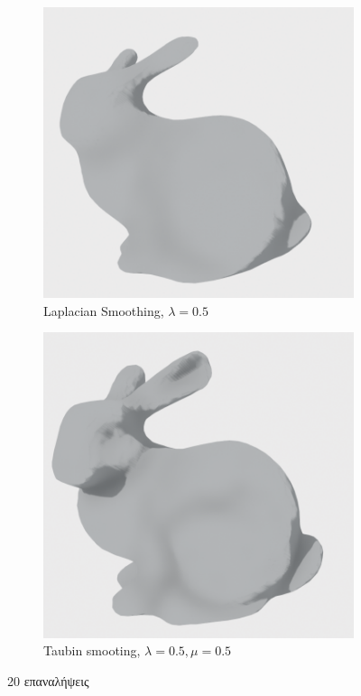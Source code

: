 \documentclass{article}
\begin{document}
\begin{figure}[h]
	\begin{subfigure}{0.5\textwidth}
		\includegraphics[width=0.9\linewidth]{"8.png"}
		\caption{Laplacian Smoothing, $\lambda = 0.5$}
	\end{subfigure}
	\begin{subfigure}{0.5\textwidth}
		\includegraphics[width=0.9\linewidth]{"9.png"}
		\caption{Taubin smooting, $\lambda = 0.5, \mu = 0.5$}
	\end{subfigure}
	\caption{20 επαναλήψεις}
\end{figure}
\end{document}
